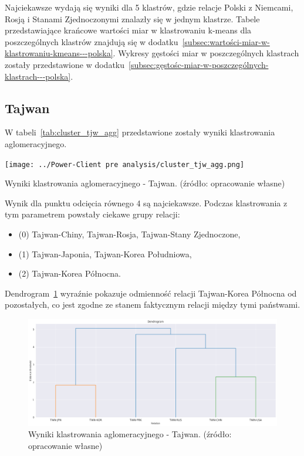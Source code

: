 \documentclass[11pt]{report}
\begin{document}
    Najciekawsze wydają się wyniki dla 5 klastrów, gdzie relacje Polski z Niemcami, Rosją i Stanami Zjednoczonymi znalazły się w jednym klastrze.
    Tabele przedstawiające krańcowe wartości miar w klastrowaniu k-means dla poszczególnych klastrów znajdują się w dodatku~\ref{subsec:wartości-miar-w-klastrowaniu-kmeans---polska}.
    Wykresy gęstości miar w poszczególnych klastrach zostały przedstawione w dodatku~\ref{subsec:gęstośc-miar-w-poszczególnych-klastrach---polska}.

    \subsection{Tajwan}
    W tabeli~\ref{tab:cluster_tjw_agg} przedstawione zostały wyniki klastrowania aglomeracyjnego.
    \begin{table}[!htp]
        \centering
        \texttt{[image: ../Power-Client pre analysis/cluster\_tjw\_agg.png]}
        \caption{Wyniki klastrowania aglomeracyjnego - Tajwan. (źródło: opracowanie własne)}
        \label{tab:cluster_tjw_agg}
    \end{table}
    Wynik dla punktu odcięcia równego 4 są najciekawsze.
    Podczas klastrowania z tym parametrem powstały ciekawe grupy relacji:
    \begin{itemize}
        \item (0) Tajwan-Chiny, Tajwan-Rosja, Tajwan-Stany Zjednoczone,
        \item (1) Tajwan-Japonia, Tajwan-Korea Południowa,
        \item (2) Tajwan-Korea Północna.
    \end{itemize}


    Dendrogram~\ref{fig:cluster_tjw_agg_dendrogram} wyraźnie pokazuje odmienność relacji Tajwan-Korea Północna od pozostałych,
    co jest zgodne ze stanem faktycznym relacji między tymi państwami.
    \begin{figure}[!htp]
        \centering
        \includegraphics[width=\linewidth]{../Power-Client pre analysis/cluster_tjw_agg_dendrogram.png}
        \caption{Wyniki klastrowania aglomeracyjnego - Tajwan. (źródło: opracowanie własne)}
        \label{fig:cluster_tjw_agg_dendrogram}
    \end{figure}
\end{document}
